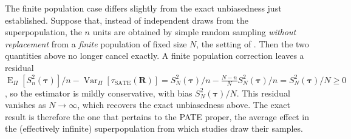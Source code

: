 \documentclass[12pt,leqno]{article}
\theoremstyle{newstyle}
\DeclareMathOperator{\E}{\mathrm{E}}
\DeclareMathOperator{\Var}{\mathrm{Var}}
\newcommand{\bR}{\bm{R}}   \newcommand{\br}{\bm{r}}   %
\newcommand{\ER}{\E_{\Pi}}       \newcommand{\VarR}{\Var_{\Pi}}     %
\newcommand{\tauS}{\tau_{\text{SATE}}}
\newcommand{\Ssq}[2][n]{S_{#1}^{2}(#2)}
\begin{document}
The finite population case differs slightly from the exact unbiasedness just established. Suppose that, instead of independent draws from the superpopulation, the $n$ units are obtained by simple random sampling \textit{without replacement} from a \textit{finite} population of fixed size $N$, the setting of . Then the two quantities above no longer cancel exactly. A finite population correction leaves a residual $\ER[\Ssq{\bm{\tau}}]/n - \VarR[\tauS(\bR)] = \Ssq[N]{\bm{\tau}}/n - \frac{N - n}{N}\Ssq[N]{\bm{\tau}}/n = \Ssq[N]{\bm{\tau}}/N \geq 0$, so the estimator is mildly conservative, with bias $\Ssq[N]{\bm{\tau}}/N$. This residual vanishes as $N \to \infty$, which recovers the exact unbiasedness above. The exact result is therefore the one that pertains to the PATE proper, the average effect in the (effectively infinite) superpopulation from which studies draw their samples.

\begin{singlespace}


\end{singlespace}
\end{document}
